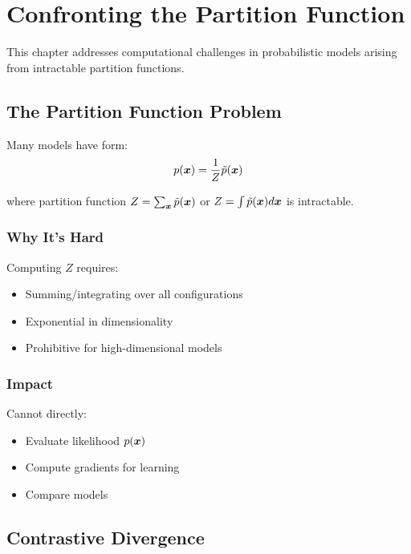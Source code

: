 
\chapter{Confronting the Partition Function}
\label{chap:partition-function}

This chapter addresses computational challenges in probabilistic models arising from intractable partition functions.

\section{The Partition Function Problem}
\label{sec:partition-problem}

Many models have form:
\begin{equation}
p(\boldsymbol{x}) = \frac{1}{Z} \tilde{p}(\boldsymbol{x})
\end{equation}

where partition function $Z = \sum_{\boldsymbol{x}} \tilde{p}(\boldsymbol{x})$ or $Z = \int \tilde{p}(\boldsymbol{x}) d\boldsymbol{x}$ is intractable.

\subsection{Why It's Hard}

Computing $Z$ requires:
\begin{itemize}
    \item Summing/integrating over all configurations
    \item Exponential in dimensionality
    \item Prohibitive for high-dimensional models
\end{itemize}

\subsection{Impact}

Cannot directly:
\begin{itemize}
    \item Evaluate likelihood $p(\boldsymbol{x})$
    \item Compute gradients for learning
    \item Compare models
\end{itemize}

\section{Contrastive Divergence}
\label{sec:contrastive-divergence}

